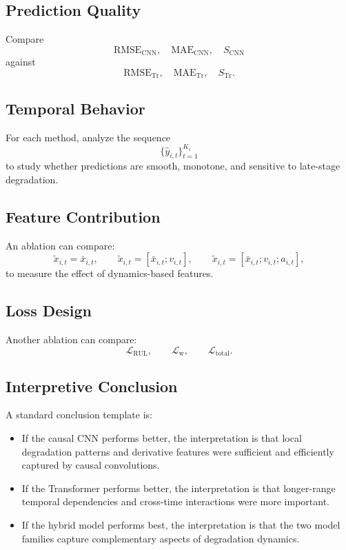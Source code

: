 \documentclass[11pt,a4paper]{article}
\begin{document}
\subsection{Prediction Quality}
Compare
\begin{equation}
    \mathrm{RMSE}_{\mathrm{CNN}}, \quad \mathrm{MAE}_{\mathrm{CNN}}, \quad S_{\mathrm{CNN}}
\end{equation}
against
\begin{equation}
    \mathrm{RMSE}_{\mathrm{Tr}}, \quad \mathrm{MAE}_{\mathrm{Tr}}, \quad S_{\mathrm{Tr}}.
\end{equation}

\subsection{Temporal Behavior}
For each method, analyze the sequence
\begin{equation}
    \{\hat{y}_{i,t}\}_{t=1}^{K_i}
\end{equation}
to study whether predictions are smooth, monotone, and sensitive to late-stage degradation.

\subsection{Feature Contribution}
An ablation can compare:
\begin{equation}
    \tilde{x}_{i,t} = \bar{x}_{i,t},
    \qquad
    \tilde{x}_{i,t} = [\bar{x}_{i,t};v_{i,t}],
    \qquad
    \tilde{x}_{i,t} = [\bar{x}_{i,t};v_{i,t};a_{i,t}],
\end{equation}
to measure the effect of dynamics-based features.

\subsection{Loss Design}
Another ablation can compare:
\begin{equation}
    \mathcal{L}_{\mathrm{RUL}},
    \qquad
    \mathcal{L}_{\mathrm{w}},
    \qquad
    \mathcal{L}_{\mathrm{total}}.
\end{equation}

\subsection{Interpretive Conclusion}
A standard conclusion template is:
\begin{itemize}
    \item If the causal CNN performs better, the interpretation is that local degradation patterns and derivative features were sufficient and efficiently captured by causal convolutions.
    \item If the Transformer performs better, the interpretation is that longer-range temporal dependencies and cross-time interactions were more important.
    \item If the hybrid model performs best, the interpretation is that the two model families capture complementary aspects of degradation dynamics.
\end{itemize}
\end{document}
